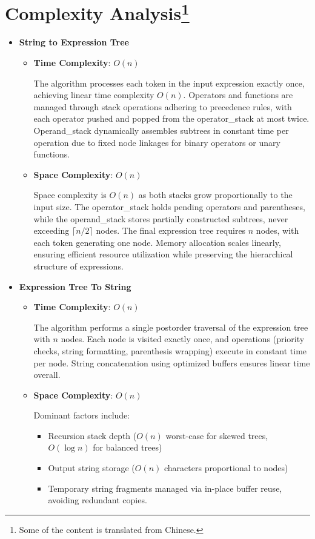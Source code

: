 \documentclass{report}
\begin{document}
\section*{Complexity Analysis\footnote{Some of the content is translated from Chinese.}}
\begin{itemize}
    \item \textbf{String to Expression Tree}
    \begin{itemize}
        \item \textbf{Time Complexity}: $O(n)$  

        The algorithm processes each token in the input expression exactly once, achieving linear time complexity $O(n)$. Operators and functions are managed through stack operations adhering to precedence rules, with each operator pushed and popped from the operator\_stack at most twice. Operand\_stack dynamically assembles subtrees in constant time per operation due to fixed node linkages for binary operators or unary functions.
        
        \item \textbf{Space Complexity}: $O(n)$  
        
        Space complexity is \(O(n)\) as both stacks grow proportionally to the input size. The operator\_stack holds pending operators and parentheses, while the operand\_stack stores partially constructed subtrees, never exceeding \(\lceil n/2 \rceil\) nodes. The final expression tree requires \(n\) nodes, with each token generating one node. Memory allocation scales linearly, ensuring efficient resource utilization while preserving the hierarchical structure of expressions.
    \end{itemize}
    
    \item \textbf{Expression Tree To String}
    \begin{itemize}
        \item \textbf{Time Complexity}: $O(n)$  

        The algorithm performs a single postorder traversal of the expression tree with \(n\) nodes. Each node is visited exactly once, and operations (priority checks, string formatting, parenthesis wrapping) execute in constant time per node. String concatenation using optimized buffers ensures linear time overall.
        \item \textbf{Space Complexity}: $O(n)$  

        Dominant factors include:
        \begin{itemize}
            \item Recursion stack depth (\(O(n)\) worst-case for skewed trees, \(O(\log n)\) for balanced trees)
            \item Output string storage (\(O(n)\) characters proportional to nodes)
            \item Temporary string fragments managed via in-place buffer reuse, avoiding redundant copies.  
        \end{itemize}
    \end{itemize}


\end{itemize}
\end{document}
